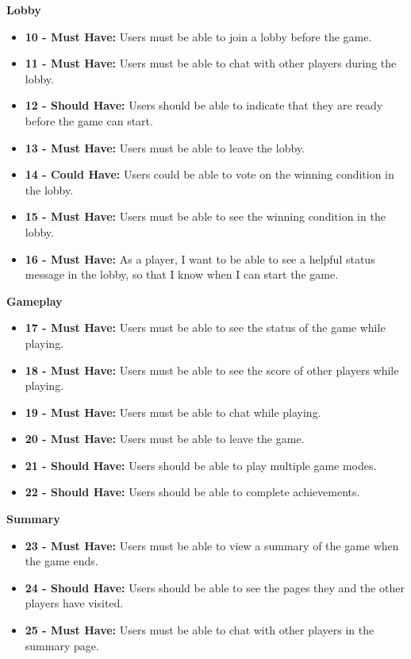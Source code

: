 \documentclass{l4proj}
\begin{document}
\textbf{Lobby}
\begin{itemize}
    \item[] \textbf{10 - Must Have:} Users must be able to join a lobby before the game.
    \item[] \textbf{11 - Must Have:} Users must be able to chat with other players during the lobby.
    \item[] \textbf{12 - Should Have:} Users should be able to indicate that they are ready before the game can start.
    \item[] \textbf{13 - Must Have:} Users must be able to leave the lobby.
    \item[] \textbf{14 - Could Have:} Users could be able to vote on the winning condition in the lobby.
    \item[] \textbf{15 - Must Have:} Users must be able to see the winning condition in the lobby.
    \item[] \textbf{16 - Must Have:} As a player, I want to be able to see a helpful status message in the lobby, so that I know when I can start the game.
\end{itemize}

\textbf{Gameplay}
\begin{itemize}
    \item[] \textbf{17 - Must Have:} Users must be able to see the status of the game while playing.
    \item[] \textbf{18 - Must Have:} Users must be able to see the score of other players while playing.
    \item[] \textbf{19 - Must Have:} Users must be able to chat while playing.
    \item[] \textbf{20 - Must Have:} Users must be able to leave the game.
    \item[] \textbf{21 - Should Have:} Users should be able to play multiple game modes.
    \item[] \textbf{22 - Should Have:} Users should be able to complete achievements.
\end{itemize}

\textbf{Summary}
\begin{itemize}
    \item[] \textbf{23 - Must Have:}  Users must be able to view a summary of the game when the game ends.
    \item[] \textbf{24 - Should Have:} Users should be able to see the pages they and the other players have visited.
    \item[] \textbf{25 - Must Have:}  Users must be able to chat with other players in the summary page.
\end{itemize}
\end{document}
